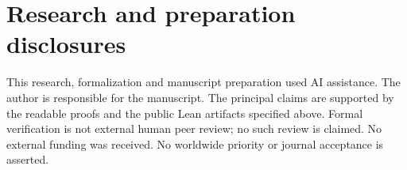 \documentclass[11pt]{article}
\begin{document}
\section*{Research and preparation disclosures}
This research, formalization and manuscript preparation used AI assistance.
The author is responsible for the manuscript. The principal claims are
supported by the readable proofs and the public Lean artifacts specified
above. Formal verification is not external human peer review; no such review
is claimed. No external funding was received. No worldwide priority or
journal acceptance is asserted.
\end{document}
